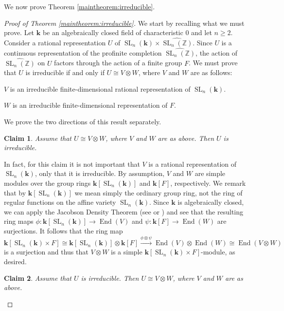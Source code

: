 \documentclass[11pt]{article}
\numberwithin{equation}{section}
\theoremstyle{plain}
\newtheorem*{claim}{Claim}
\theoremstyle{definition}
\theoremstyle{remark}
\DeclareMathOperator{\End}{End}
\DeclareMathOperator{\SL}{SL}
\newcommand\Z{\ensuremath{\mathbb{Z}}}
\newcommand\bk{\ensuremath{\mathbf{k}}}
\newcommand\tSLn{\ensuremath{\widehat{\SL_n(\Z)}}}
\begin{document}
We now prove Theorem \ref{maintheorem:irreducible}.

\begin{proof}[Proof of Theorem \ref{maintheorem:irreducible}]
We start by recalling what we must prove.  Let $\bk$ be an algebraically closed field of characteristic $0$ and let 
$n \geq 2$.  Consider a rational representation $U$ of $\SL_n(\bk) \times \tSLn$.  Since $U$ is a continuous
representation of the profinite completion $\tSLn$, the action of $\tSLn$ on $U$ factors through the action of
a finite group $F$.  We must prove that $U$ is
irreducible if and only if $U \cong V \otimes W$, where $V$ and $W$ are as follows:
\begin{compactitem}
\item $V$ is an irreducible finite-dimensional rational representation of $\SL_n(\bk)$.
\item $W$ is an irreducible finite-dimensional representation of $F$.
\end{compactitem}
We prove the two directions of this result separately.

\begin{claim}
Assume that $U \cong V \otimes W$, where $V$ and $W$ are as above.  Then $U$ is irreducible.
\end{claim}

In fact, for this claim it is not important that $V$ is a rational representation of $\SL_n(\bk)$, only
that it is irreducible.  By assumption, $V$ and $W$ are simple modules over the group rings
$\bk[\SL_n(\bk)]$ and $\bk[F]$, respectively.  We remark that by $\bk[\SL_n(\bk)]$ we mean simply
the ordinary group ring, not the ring of regular functions on the affine variety $\SL_n(\bk)$.  
Since $\bk$ is algebraically closed, we can apply the Jacobson Density Theorem (see \cite[Theorem 3.2.2]{EtingofBook} or \cite{PutmanDensity})
and see that the resulting ring maps
$\phi\colon \bk[\SL_n(\bk)] \rightarrow \End(V)$ and $\psi\colon \bk[F] \rightarrow \End(W)$ are surjections.
It follows that the ring map
\[\bk[\SL_n(\bk) \times F] \cong \bk[\SL_n(\bk)] \otimes \bk[F] \stackrel{\phi \otimes \psi}{\longrightarrow} \End(V) \otimes \End(W) \cong \End(V \otimes W)\]
is a surjection and thus that $V \otimes W$ is a simple $\bk[\SL_n(\bk) \times F]$-module, as desired.

\begin{claim}
Assume that $U$ is irreducible.  Then $U \cong V \otimes W$, where $V$ and $W$ are as above.
\end{claim}


\end{proof}
\end{document}
